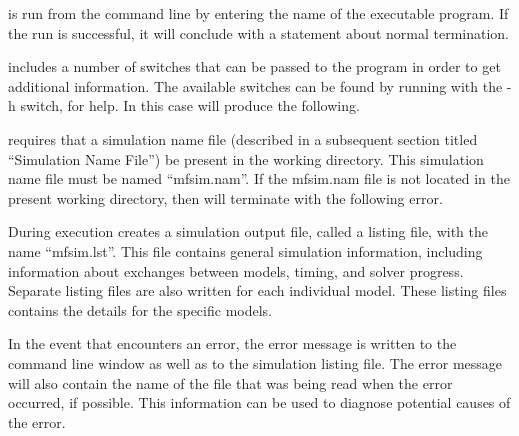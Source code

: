 \mf is run from the command line by entering the name of the \mf executable program.  If the run is successful, it will conclude with a statement about normal termination.



\noindent \mf includes a number of switches that can be passed to the program in order to get additional information.  The available switches can be found by running \mf with the -h switch, for help.  In this case \mf will produce the following.



\noindent \mf requires that a simulation name file (described in a subsequent section titled ``Simulation Name File'') be present in the working directory.  This simulation name file must be named ``mfsim.nam''.  If the mfsim.nam file is not located in the present working directory, then \mf will terminate with the following error.  



During execution \mf creates a simulation output file, called a listing file, with the name ``mfsim.lst''.  This file contains general simulation information, including information about exchanges between models, timing, and solver progress.  Separate listing files are also written for each individual model.  These listing files contains the details for the specific models.

In the event that \mf encounters an error, the error message is written to the command line window as well as to the simulation listing file.  The error message will also contain the name of the file that was being read when the error occurred, if possible.  This information can be used to diagnose potential causes of the error.  
